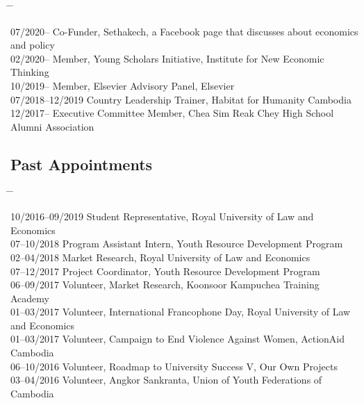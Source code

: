 \documentclass[10pt,a4paper]{article}
\newcommand{\tabbedblock}[1]{

	\begin{tabbing}
		\hspace{3cm} \= \hspace{4cm} \= \kill
		#1
	\end{tabbing}
}
\begin{document}
\tabbedblock{


	07/2020-- \> Co-Funder, Sethakech, a Facebook page that discusses about economics and policy\\

	02/2020-- \> Member, Young Scholars Initiative, Institute for New Economic Thinking\\

	10/2019-- \> Member, Elsevier Advisory Panel, Elsevier\\

	07/2018--12/2019 \> Country Leadership Trainer, Habitat for Humanity Cambodia\\

	12/2017-- \> Executive Committee Member, Chea Sim Reak Chey High School Alumni Association
}
	
\subsection*{Past Appointments}

\tabbedblock{

	10/2016--09/2019 \> Student Representative, Royal University of Law and Economics\\

	07--10/2018 \> Program Assistant Intern, Youth Resource Development Program\\

	02--04/2018 \> Market Research, Royal University of Law and Economics\\

	07--12/2017 \> Project Coordinator, Youth Resource Development Program\\ 

	06--09/2017 \> Volunteer, Market Research, Koonsoor Kampuchea Training Academy\\

	01--03/2017 \> Volunteer, International Francophone Day,  Royal University of Law and Economics\\

	01--03/2017 \> Volunteer, Campaign to End Violence Against Women, ActionAid Cambodia\\

	06--10/2016 \> Volunteer, Roadmap to University Success V, Our Own Projects\\

	03--04/2016 \> Volunteer, Angkor Sankranta, Union of Youth Federations of Cambodia
}
\end{document}
